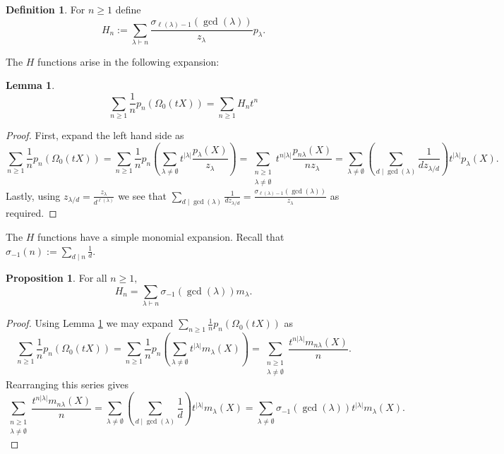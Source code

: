 \documentclass[12pt,reqno]{amsart}
\theoremstyle{definition}
\newtheorem{lem}[thm]{Lemma}
\newtheorem{prop}[thm]{Proposition}
\newtheorem{defn}[thm]{Definition}
\begin{document}
\begin{defn}
For $n \geq 1$ define
    $$H_n:= \sum_{\lambda \vdash n} \frac{\sigma_{\ell(\lambda)-1}(\gcd(\lambda))}{z_{\lambda}} p_{\lambda}.$$
\end{defn}

The $H$ functions arise in the following expansion:

\begin{lem}\label{H function lem}
    $$\sum_{n \geq 1} \frac{1}{n} p_n\left( \Omega_0(tX) \right) = \sum_{n \geq 1} H_n t^n$$
\end{lem}
\begin{proof}
    First, expand the left hand side as 
    $$\sum_{n\geq 1} \frac{1}{n} p_n \left( \Omega_0(tX) \right) = \sum_{n \geq 1} \frac{1}{n} p_n \left( \sum_{\lambda \neq \emptyset} t^{|\lambda|} \frac{p_{\lambda}(X)}{z_{\lambda}} \right) = \sum_{\substack{n\geq 1 \\ \lambda \neq \emptyset}} t^{n|\lambda|}\frac{p_{n\lambda}(X)}{nz_{\lambda}} = \sum_{\lambda \neq \emptyset} \left( \sum_{d \mid \gcd(\lambda)}\frac{1}{dz_{\lambda/d}}\right) t^{|\lambda|} p_{\lambda}(X).$$ Lastly, using $z_{\lambda/d} = \frac{z_{\lambda}}{d^{\ell(\lambda)}}$ we see that $\sum_{d \mid \gcd(\lambda)}\frac{1}{dz_{\lambda/d}} = \frac{\sigma_{\ell(\lambda)-1}(\gcd(\lambda))}{z_{\lambda}}$ as required.
\end{proof}

The $H$ functions have a simple monomial expansion. Recall that $\sigma_{-1}(n) := \sum_{d \mid n} \frac{1}{d}.$

\begin{prop}
For all $n \geq 1,$
    $$H_n = \sum_{\lambda \vdash n} \sigma_{-1}(\gcd(\lambda)) m_{\lambda}.$$
\end{prop}
\begin{proof}
    Using Lemma \ref{H function lem} we may expand $\sum_{n\geq 1} \frac{1}{n} p_n \left( \Omega_0(tX) \right)$ as 
    $$\sum_{n\geq 1} \frac{1}{n} p_n \left( \Omega_0(tX) \right) = \sum_{n\geq 1} \frac{1}{n} p_n \left( \sum_{\lambda \neq \emptyset} t^{|\lambda|} m_{\lambda}(X) \right) = \sum_{\substack{n \geq 1 \\ \lambda \neq \emptyset}} \frac{t^{n|\lambda|}m_{n\lambda}(X)}{n}.$$ Rearranging this series gives 
    $$\sum_{\substack{n \geq 1 \\ \lambda \neq \emptyset}} \frac{t^{n|\lambda|}m_{n\lambda}(X)}{n} = \sum_{\lambda \neq \emptyset} \left( \sum_{d\mid \gcd(\lambda)} \frac{1}{d} \right) t^{|\lambda|} m_{\lambda}(X) = \sum_{\lambda \neq \emptyset} \sigma_{-1}(\gcd(\lambda)) t^{|\lambda|} m_{\lambda}(X).$$
\end{proof}
\end{document}
